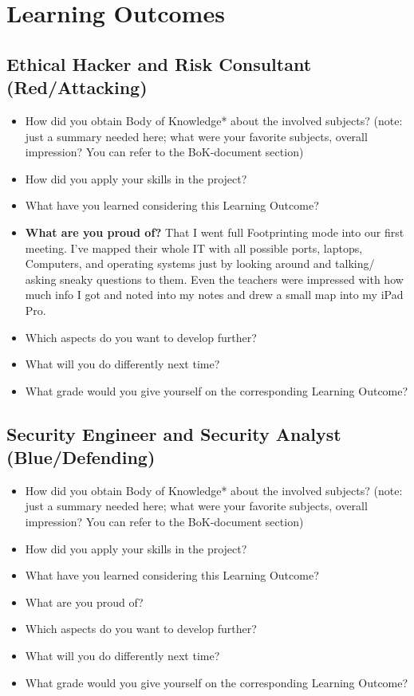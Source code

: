 \documentclass[12pt, letterpaper]{article}
\begin{document}
\newpage
\section{Learning Outcomes}
\subsection{Ethical Hacker and Risk Consultant (Red/Attacking)}
\begin{itemize}
\item How did you obtain Body of Knowledge* about the involved subjects? (note: just a summary needed here; what were your favorite subjects, overall impression? You can refer to the BoK-document section)
\item How did you apply your skills in the project?
\item What have you learned considering this Learning Outcome?
\item \textbf{What are you proud of?}
\hfill\break
\hfill\break
That I went full Footprinting mode into our first meeting. I've mapped their whole IT with all possible ports, laptops, Computers, and operating systems just by looking around and talking/ asking sneaky questions to them. Even the teachers were impressed with how much info I got and noted into my notes and drew a small map into my iPad Pro.
\item Which aspects do you want to develop further?
\item What will you do differently next time?
\item What grade would you give yourself on the corresponding Learning Outcome?
\end{itemize}

\subsection{Security Engineer and Security Analyst (Blue/Defending)}
\begin{itemize}
\item How did you obtain Body of Knowledge* about the involved subjects? (note: just a summary needed here; what were your favorite subjects, overall impression? You can refer to the BoK-document section)
\item How did you apply your skills in the project?
\item What have you learned considering this Learning Outcome?
\item What are you proud of?
\item Which aspects do you want to develop further?
\item What will you do differently next time?
\item What grade would you give yourself on the corresponding Learning Outcome?
\end{itemize}
\end{document}
